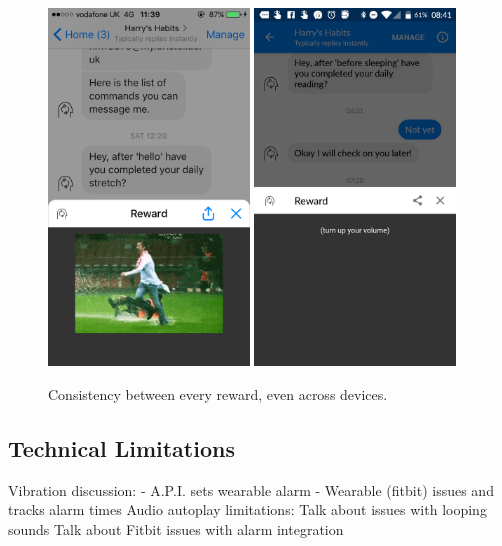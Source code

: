 \begin{figure}[H]
  \centering
  \includegraphics[width=2.1in]{../resources/design/reward-visual-2.png}
  \hspace{10px}
  \includegraphics[width=2.1in]{../resources/design/reward-audio.png}
  \caption{Consistency between every reward, even across devices.}
  \label{fig:rewards_consistency}
\end{figure}

\subsection{Technical Limitations}
Vibration discussion: - A.P.I. sets wearable alarm - Wearable (fitbit) issues and tracks alarm times
Audio autoplay limitations:
Talk about issues with looping sounds\newline
 Talk about Fitbit issues with alarm integration

